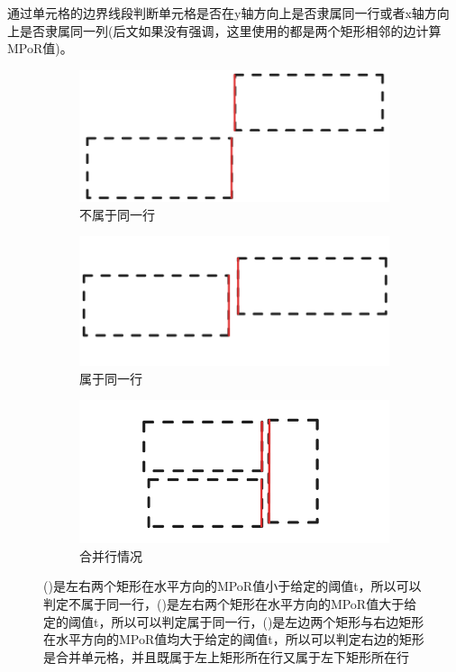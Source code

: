 \documentclass[UTF8,12pt, AutoFakeBold,fontset = founder]{ctexart}
\begin{document}
通过单元格的边界线段判断单元格是否在y轴方向上是否隶属同一行或者x轴方向上是否隶属同一列(后文如果没有强调，这里使用的都是两个矩形相邻的边计算MPoR值)。

\begin{figure}[H]
    \centering
    \begin{subfigure}[b]{0.3\textwidth}
        \includegraphics[width=\textwidth]{../images/a.png}
        \caption{不属于同一行}
        \label{fig:a}
    \end{subfigure}
    \hfill
    \begin{subfigure}[b]{0.3\textwidth}
        \includegraphics[width=\textwidth]{../images/b.png}
        \caption{属于同一行}
        \label{fig:b}
    \end{subfigure}
    \hfill
    \begin{subfigure}[b]{0.3\textwidth}
        \includegraphics[width=\textwidth]{../images/c.png}
        \caption{合并行情况}
        \label{fig:c}
    \end{subfigure}
    \captionsetup{labelsep=colon} 
    \caption{()是左右两个矩形在水平方向的MPoR值小于给定的阈值t，所以可以判定不属于同一行，()是左右两个矩形在水平方向的MPoR值大于给定的阈值t，所以可以判定属于同一行，()是左边两个矩形与右边矩形在水平方向的MPoR值均大于给定的阈值t，所以可以判定右边的矩形是合并单元格，并且既属于左上矩形所在行又属于左下矩形所在行}
\end{figure}
\end{document}
